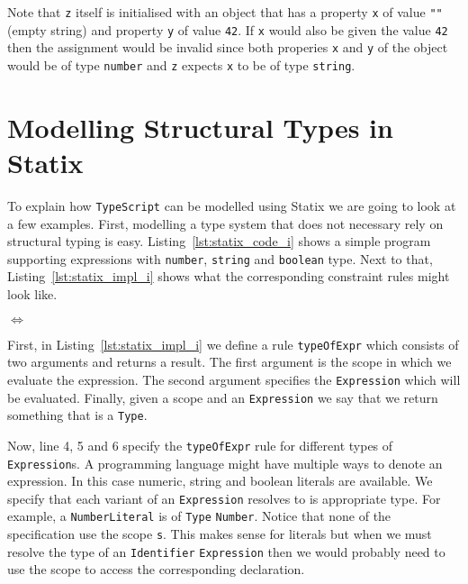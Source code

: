 \documentclass{article}
\newcommand{\ttt}[1]{\texttt{#1}}
\begin{document}
Note that \ttt{z} itself is initialised with an object that has a property \ttt{x} of value \ttt{""} (empty string) and property \ttt{y} of value \ttt{42}.
If \ttt{x} would also be given the value \ttt{42} then the assignment would be invalid since both properies \ttt{x} and \ttt{y} of the object would be of type \ttt{number} and \ttt{z} expects \ttt{x} to be of type \ttt{string}.

\section*{Modelling Structural Types in Statix}
To explain how \ttt{TypeScript} can be modelled using Statix we are going to look at a few examples.
First, modelling a type system that does not necessary rely on structural typing is easy.
Listing~\ref{lst:statix_code_i} shows a simple program supporting expressions with \ttt{number}, \ttt{string} and \ttt{boolean} type.
Next to that, Listing~\ref{lst:statix_impl_i} shows what the corresponding constraint rules might look like.

\noindent
\begin{minipage}{.45\textwidth}

\end{minipage}
\hfill$\Longleftrightarrow$\hfill\hfill\hfill
\begin{minipage}{.45\textwidth}

\end{minipage}
First, in Listing~\ref{lst:statix_impl_i} we define a rule \ttt{typeOfExpr} which consists of two arguments and returns a result.
The first argument is the scope in which we evaluate the expression.
The second argument specifies the \ttt{Expression} which will be evaluated.
Finally, given a scope and an \ttt{Expression} we say that we return something that is a \ttt{Type}.

Now, line 4, 5 and 6 specify the \ttt{typeOfExpr} rule for different types of \ttt{Expression}s.
A programming language might have multiple ways to denote an expression.
In this case numeric, string and boolean literals are available.
We specify that each variant of an \ttt{Expression} resolves to is appropriate type.
For example, a \ttt{NumberLiteral} is of \ttt{Type} \ttt{Number}.
Notice that none of the specification use the scope \ttt{s}.
This makes sense for literals but when we must resolve the type of an \ttt{Identifier} \ttt{Expression} then we would probably need to use the scope to access the corresponding declaration.



\end{document}
